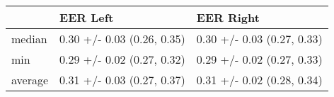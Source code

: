 \begin{tabular}{lll}
\toprule
{} &                    EER Left &                   EER Right \\
\midrule
median  &  0.30 +/- 0.03 (0.26, 0.35) &  0.30 +/- 0.03 (0.27, 0.33) \\
min     &  0.29 +/- 0.02 (0.27, 0.32) &  0.29 +/- 0.02 (0.27, 0.33) \\
average &  0.31 +/- 0.03 (0.27, 0.37) &  0.31 +/- 0.02 (0.28, 0.34) \\
\bottomrule
\end{tabular}
